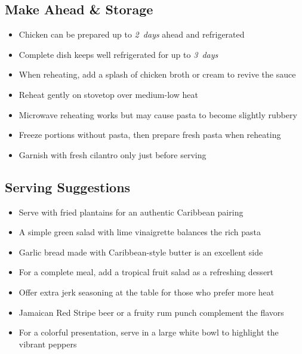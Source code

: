 \documentclass[11pt,letterpaper]{article}
\begin{document}
{\begin{multicols}{2}
\subsection*{Make Ahead \& Storage}
\begin{itemize}
    \item Chicken can be prepared up to \textit{2~days} ahead and refrigerated
    \item Complete dish keeps well refrigerated for up to \textit{3~days}
    \item When reheating, add a splash of chicken broth or cream to revive the sauce
    \item Reheat gently on stovetop over medium-low heat
    \item Microwave reheating works but may cause pasta to become slightly rubbery
    \item Freeze portions without pasta, then prepare fresh pasta when reheating
    \item Garnish with fresh cilantro only just before serving
\end{itemize}

\subsection*{Serving Suggestions}
\begin{itemize}
    \item Serve with fried plantains for an authentic Caribbean pairing
    \item A simple green salad with lime vinaigrette balances the rich pasta
    \item Garlic bread made with Caribbean-style butter is an excellent side
    \item For a complete meal, add a tropical fruit salad as a refreshing dessert
    \item Offer extra jerk seasoning at the table for those who prefer more heat
    \item Jamaican Red Stripe beer or a fruity rum punch complement the flavors
    \item For a colorful presentation, serve in a large white bowl to highlight the vibrant peppers
\end{itemize}

\end{multicols}
}
\end{document}

